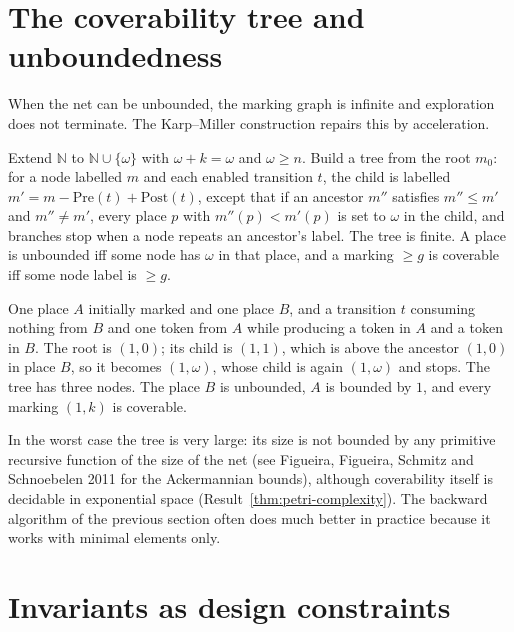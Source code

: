 \section{The coverability tree and unboundedness}\label{sec:km}

When the net can be unbounded, the marking graph is infinite and exploration does not terminate. The Karp--Miller construction repairs this by acceleration.

\begin{established}\label{thm:km}
Extend $\mathbb N$ to $\mathbb N\cup\{\omega\}$ with $\omega+k=\omega$ and $\omega\ge n$. Build a tree from the root $m_0$: for a node labelled $m$ and each enabled transition $t$, the child is labelled $m'=m-\mathrm{Pre}(t)+\mathrm{Post}(t)$, except that if an ancestor $m''$ satisfies $m''\le m'$ and $m''\ne m'$, every place $p$ with $m''(p)<m'(p)$ is set to $\omega$ in the child, and branches stop when a node repeats an ancestor's label. The tree is finite. A place is unbounded iff some node has $\omega$ in that place, and a marking $\ge g$ is coverable iff some node label is $\ge g$.
\end{established}

\begin{example}[A source]\label{ex:source}
One place $A$ initially marked and one place $B$, and a transition $t$ consuming nothing from $B$ and one token from $A$ while producing a token in $A$ and a token in $B$. The root is $(1,0)$; its child is $(1,1)$, which is above the ancestor $(1,0)$ in place $B$, so it becomes $(1,\omega)$, whose child is again $(1,\omega)$ and stops. The tree has three nodes. The place $B$ is unbounded, $A$ is bounded by $1$, and every marking $(1,k)$ is coverable.
\end{example}

In the worst case the tree is very large: its size is not bounded by any primitive recursive function of the size of the net (see Figueira, Figueira, Schmitz and Schnoebelen 2011 for the Ackermannian bounds), although coverability itself is decidable in exponential space (Result~\ref{thm:petri-complexity}). The backward algorithm of the previous section often does much better in practice because it works with minimal elements only.

\section{Invariants as design constraints}\label{sec:invariants-design}

